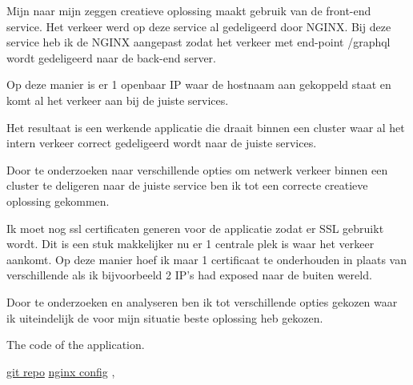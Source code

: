 {{{			Mijn naar mijn zeggen creatieve oplossing maakt gebruik van de front-end service.
			Het verkeer werd op deze service al gedeligeerd door NGINX.
			Bij deze service heb ik de NGINX aangepast zodat het verkeer met end-point /graphql wordt gedeligeerd naar de back-end server.

			Op deze manier is er 1 openbaar IP waar de hostnaam aan gekoppeld staat en komt al het verkeer aan bij de juiste services.

		}
		{%
			Het resultaat is een werkende applicatie die draait binnen een cluster waar al het intern verkeer correct gedeligeerd wordt naar de juiste services.
		}
		{%
			Door te onderzoeken naar verschillende opties om netwerk verkeer binnen een cluster te deligeren naar de juiste service ben ik tot een correcte creatieve oplossing gekommen.

			Ik moet nog ssl certificaten generen voor de applicatie zodat er SSL gebruikt wordt.
			Dit is een stuk makkelijker nu er 1 centrale plek is waar het verkeer aankomt.
			Op deze manier hoef ik maar 1 certificaat te onderhouden in plaats van verschillende als ik bijvoorbeeld 2 IP's had exposed naar de buiten wereld.

			Door te onderzoeken en analyseren ben ik tot verschillende opties gekozen waar ik uiteindelijk de voor mijn situatie beste oplossing heb gekozen.

		}
		{
			The code of the application.
		}
	}
	{%
		\href{https://github.com/aladante/product_inventaris}{git repo}
		\href{https://github.com/aladante/product_inventaris/blob/main/front-end/nginx/nginx.conf}{nginx config}
	},
}
